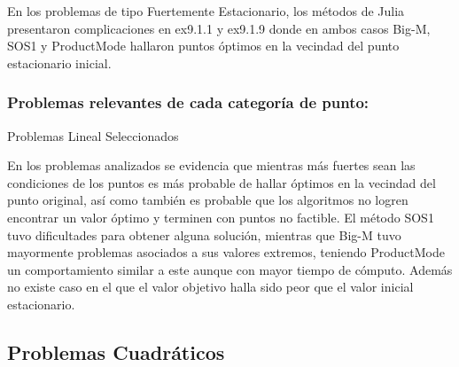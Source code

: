 En los problemas de tipo Fuertemente Estacionario, los métodos de Julia presentaron complicaciones  en  ex9.1.1 y ex9.1.9 donde en ambos casos Big-M, SOS1 y ProductMode hallaron puntos óptimos en la vecindad del punto estacionario inicial.


\subsubsection{Problemas relevantes de cada categoría de punto:}
 

\begin{resultstable}{Problemas Lineal Seleccionados}
    \end{resultstable}
    
En los problemas analizados se evidencia que mientras más fuertes sean las condiciones de los puntos es más probable de hallar óptimos en la vecindad del punto original, 
así como también es probable que los algoritmos no logren encontrar un valor óptimo y terminen con puntos no factible.
El método SOS1 tuvo dificultades para obtener alguna solución, mientras que Big-M tuvo mayormente problemas asociados a sus valores extremos, teniendo ProductMode un comportamiento similar a este aunque con mayor tiempo de cómputo.
Además no existe caso en el que el valor objetivo halla sido peor que el valor inicial estacionario.
   


\subsection{Problemas Cuadráticos}


    
